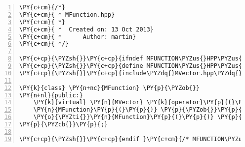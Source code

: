 \begin{Verbatim}[tabsize=2,commandchars=\\\{\},numbers=left,firstnumber=1,stepnumber=1]
\PY{c+cm}{/*}
\PY{c+cm}{ * MFunction.hpp}
\PY{c+cm}{ *}
\PY{c+cm}{ *  Created on: 13 Oct 2013}
\PY{c+cm}{ *      Author: martin}
\PY{c+cm}{ */}

\PY{c+cp}{\PYZsh{}}\PY{c+cp}{ifndef MFUNCTION\PYZus{}HPP\PYZus{}}
\PY{c+cp}{\PYZsh{}}\PY{c+cp}{define MFUNCTION\PYZus{}HPP\PYZus{}}
\PY{c+cp}{\PYZsh{}}\PY{c+cp}{include\PYZdq{}MVector.hpp\PYZdq{}}

\PY{k}{class} \PY{n+nc}{MFunction} \PY{p}{\PYZob{}}
\PY{n+nl}{public:}
	\PY{k}{virtual} \PY{n}{MVector} \PY{k}{operator}\PY{p}{(}\PY{p}{)}\PY{p}{(}\PY{k}{const} \PY{k+kt}{double}\PY{o}{\PYZam{}} \PY{n}{x}\PY{p}{,} \PY{k}{const} \PY{n}{MVector}\PY{o}{\PYZam{}} \PY{n}{y}\PY{p}{)} \PY{o}{=} \PY{l+m+mi}{0}\PY{p}{;}
	\PY{n}{MFunction}\PY{p}{(}\PY{p}{)} \PY{p}{\PYZob{}}\PY{p}{\PYZcb{}}
	\PY{o}{\PYZti{}}\PY{n}{MFunction}\PY{p}{(}\PY{p}{)} \PY{p}{\PYZob{}}\PY{p}{\PYZcb{}}
\PY{p}{\PYZcb{}}\PY{p}{;}

\PY{c+cp}{\PYZsh{}}\PY{c+cp}{endif }\PY{c+cm}{/* MFUNCTION\PYZus{}HPP\PYZus{} */}
\end{Verbatim}
